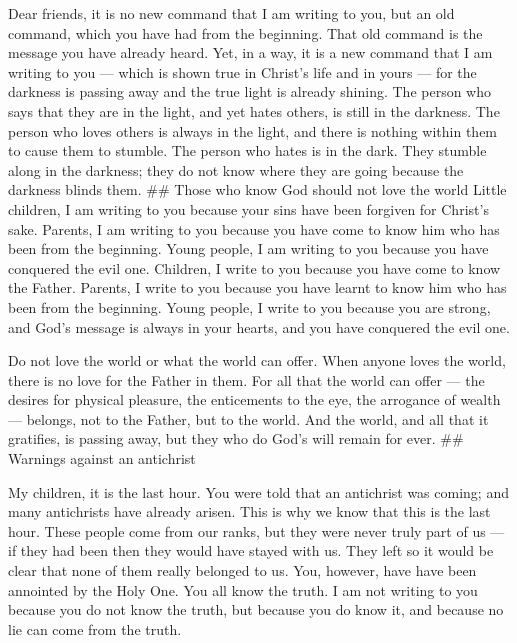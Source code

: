  Dear friends, it is no new command that I am writing to
you, but an old command, which you have had from the beginning. That old
command is the message you have already heard.  Yet, in a
way, it is a new command that I am writing to you --- which is shown
true in Christ's life and in yours --- for the darkness is passing away
and the true light is already shining.  The person who says
that they are in the light, and yet hates others, is still in the
darkness.  The person who loves others is always in the
light, and there is nothing within them to cause them to stumble.
 The person who hates is in the dark. They stumble along in
the darkness; they do not know where they are going because the darkness
blinds them. \#\# Those who know God should not love the world
 Little children, I am writing to you because your sins
have been forgiven for Christ's sake.  Parents, I am
writing to you because you have come to know him who has been from the
beginning. Young people, I am writing to you because you have conquered
the evil one. Children, I write to you because you have come to know the
Father.  Parents, I write to you because you have learnt to
know him who has been from the beginning. Young people, I write to you
because you are strong, and God's message is always in your hearts, and
you have conquered the evil one.

 Do not love the world or what the world can offer. When
anyone loves the world, there is no love for the Father in them.
 For all that the world can offer --- the desires for
physical pleasure, the enticements to the eye, the arrogance of wealth
--- belongs, not to the Father, but to the world.  And the
world, and all that it gratifies, is passing away, but they who do God's
will remain for ever. \#\# Warnings against an antichrist

 My children, it is the last hour. You were told that an
antichrist was coming; and many antichrists have already arisen. This is
why we know that this is the last hour.  These people come
from our ranks, but they were never truly part of us --- if they had
been then they would have stayed with us. They left so it would be clear
that none of them really belonged to us.  You, however,
have have been annointed by the Holy One. You all know the truth.
 I am not writing to you because you do not know the truth,
but because you do know it, and because no lie can come from the truth.

